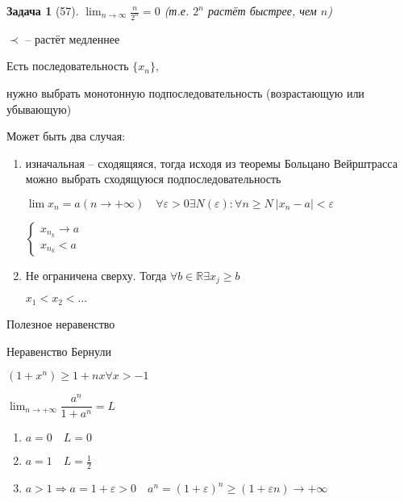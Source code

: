 \documentclass{book}
\newtheorem{Pb}{Задача}[chapter]
\begin{document}
\begin{comment}
$\lim_{n\to \infty}\dfrac{P_m(n)}{O_e(n)} = lim_{n\to \infty}\dfrac{a_mn^m+a_{m-1}n^{m-1}+\hdots+a_0}{b_ln^l+b_{l-1}n^{l-1}+\hdots+b_0}=$

$
\begin{cases}
	m>l, ~sign(\frac{a_m}{b_l})*\infty\\
	m=l, \frac{a_m}{b_l}\\
	m<l, 0
\end{cases}
$
\end{comment}

\begin{Pb}[57]
	$\lim_{n\to \infty} \frac{n}{2^n}=0$ (т.е. $2^n$ растёт быстрее, чем $n$)
\end{Pb}

$\prec$ -- растёт медленнее


Есть последовательность $\{x_n\}$,

















нужно выбрать монотонную подпоследовательность (возрастающую или убывающую)

Может быть два случая:
\begin{enumerate}
	\item изначальная -- сходящяяся, тогда исходя из теоремы Больцано  Вейрштрасса можно выбрать сходящуюся подпоследовательность 
	
	$\lim {x_n}=a (n \to +\infty)\quad \forall \varepsilon >0 \exists N(\varepsilon):\forall n \geqslant N ~|x_n-a|<\varepsilon$
	
	$\begin{cases}
	x_{n_k} \to a\\
	x_{n_k} < a
	\end{cases} $
	\item Не ограничена сверху. Тогда $\forall b \in \mathds{R} \exists x_j\geqslant b$
	
	$x_1<x_2<\hdots$
\end{enumerate}

Полезное неравенство

Неравенство Бернули

$(1+x^n)\geqslant 1 + nx \forall x >-1$

$\lim_{n\to+\infty}\dfrac{a^n}{1+a^n} = L$
\begin{enumerate}
	\item $a=0\quad L=0$
	\item $a = 1\quad L = \frac{1}{2}$
	\item $a>1 \Rightarrow a = 1 +\varepsilon > 0\quad a^n = (1+\varepsilon)^n\geqslant(1+\varepsilon n) \to +\infty$
\end{enumerate}
\end{document}
